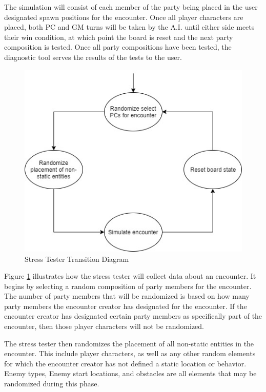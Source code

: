 \documentclass[12pt,a4paper]{report}
\begin{document}
		The simulation will consist of each member of the party being placed in the user designated spawn positions for the encounter. Once all player characters are placed, both PC and GM turns will be taken by the A.I. until either side meets their win condition, at which point the board is reset and the next party composition is tested. Once all party compositions have been tested, the diagnostic tool serves the results of the tests to the user.
		
		\begin{figure}[H]
			\centering
			\includegraphics[scale=.8]{StressTesterTransitionDiag}
			\caption{Stress Tester Transition Diagram}
			\label{fig: Stress Tester Transition Diagram}
		\end{figure}
		
		Figure \ref{fig: Stress Tester Transition Diagram} illustrates how the stress tester will collect data about an encounter. It begins by selecting a random composition of party members for the encounter. The number of party members that will be randomized is based on how many party members the encounter creator has designated for the encounter. If the encounter creator has designated certain party members as specifically part of the encounter, then those player characters will not be randomized. 
		
		The stress tester then randomizes the placement of all non-static entities in the encounter. This include player characters, as well as any other random elements for which the encounter creator has not defined a static location or behavior. Enemy types, Enemy start locations, and obstacles are all elements that may be randomized during this phase. 
		
\end{document}
